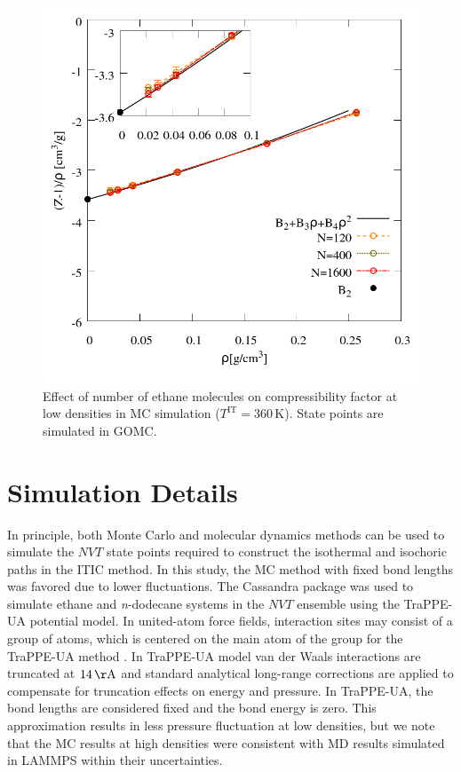 \documentclass[5p,times]{elsarticle}
\begin{document}
\begin{figure}
\includegraphics[scale=0.3]{Figures/FSE_TraPPE-C2_GOMC_IT.png}
\caption{Effect of number of ethane molecules on compressibility factor at low densities in MC simulation ($T^{\mathrm{IT}}=360 \, \mathrm{K}$). State points are simulated in GOMC.}
\label{fig:FSE_TraPPE_C2_GOMC_IT}
\end{figure}


\section{Simulation Details} \label{sec:SimDetail}
In principle, both Monte Carlo and molecular dynamics methods can be used to simulate the $NVT$ state points required to construct the isothermal and isochoric paths in the ITIC method. In this study, the MC method with fixed bond lengths was favored due to lower fluctuations. The Cassandra package \cite{Shah2017} was used to simulate ethane and \textit{n}-dodecane systems in the $NVT$ ensemble using the TraPPE-UA potential model. In united-atom force fields, interaction sites may consist of a group of atoms, which is centered on the main atom of the group for the TraPPE-UA method \cite{Smit1998}. In TraPPE-UA model van der Waals interactions are truncated at $14\,\mathrm{\AA}$ and standard analytical long-range corrections are applied to compensate for truncation effects on energy and pressure\cite{allen2017}. In TraPPE-UA, the bond lengths are considered fixed and the bond energy is zero. This approximation results in less pressure fluctuation at low densities, but we note that the MC results at high densities were consistent with MD results simulated in LAMMPS \cite{Plimpton2007} within their uncertainties.
\end{document}
